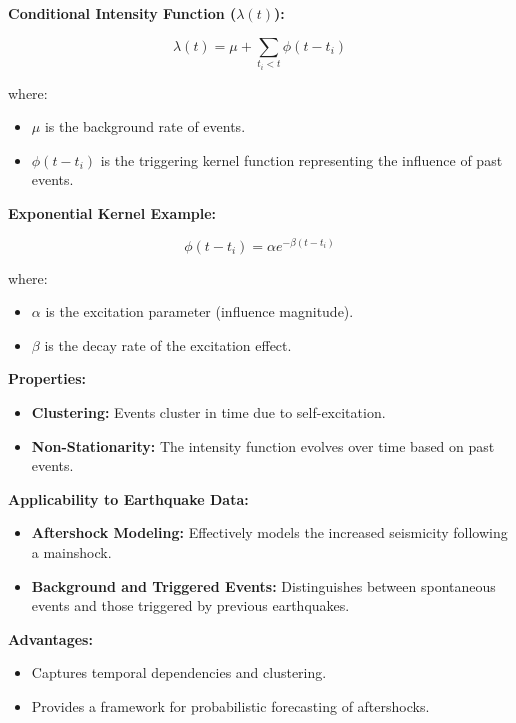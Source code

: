 \documentclass{article}
\begin{document}
\textbf{Conditional Intensity Function ($\lambda(t)$):}

\[
\lambda(t) = \mu + \sum_{t_i < t} \phi(t - t_i)
\]

where:

\begin{itemize}
    \item $\mu$ is the background rate of events.
    \item $\phi(t - t_i)$ is the triggering kernel function representing the influence of past events.
\end{itemize}

\textbf{Exponential Kernel Example:}

\[
\phi(t - t_i) = \alpha e^{-\beta (t - t_i)}
\]

where:

\begin{itemize}
    \item $\alpha$ is the excitation parameter (influence magnitude).
    \item $\beta$ is the decay rate of the excitation effect.
\end{itemize}

\textbf{Properties:}

\begin{itemize}
    \item \textbf{Clustering:} Events cluster in time due to self-excitation.
    \item \textbf{Non-Stationarity:} The intensity function evolves over time based on past events.
\end{itemize}

\textbf{Applicability to Earthquake Data:}

\begin{itemize}
    \item \textbf{Aftershock Modeling:} Effectively models the increased seismicity following a mainshock.
    \item \textbf{Background and Triggered Events:} Distinguishes between spontaneous events and those triggered by previous earthquakes.
\end{itemize}

\textbf{Advantages:}

\begin{itemize}
    \item Captures temporal dependencies and clustering.
    \item Provides a framework for probabilistic forecasting of aftershocks.
\end{itemize}
\end{document}
